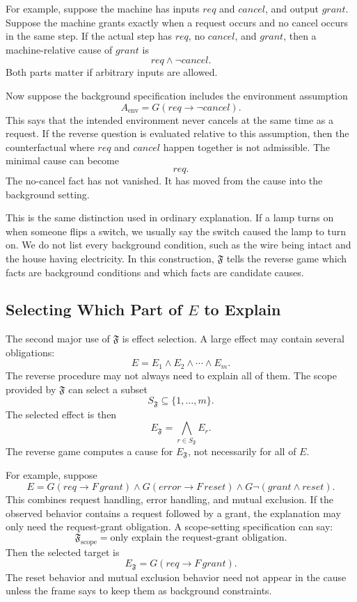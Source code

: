 \documentclass[11pt]{article}
\theoremstyle{remark}
\newcommand{\Frame}{\mathfrak{F}}
\begin{document}
For example, suppose the machine has inputs \(req\) and \(cancel\), and output
\(grant\). Suppose the machine grants exactly when a request occurs and no
cancel occurs in the same step. If the actual step has \(req\), no \(cancel\),
and \(grant\), then a machine-relative cause of \(grant\) is
\[
  req\land \neg cancel.
\]
Both parts matter if arbitrary inputs are allowed.

Now suppose the background specification includes the environment assumption
\[
  A_{\mathrm{env}} = G(req\rightarrow \neg cancel).
\]
This says that the intended environment never cancels at the same time as a
request. If the reverse question is evaluated relative to this assumption, then
the counterfactual where \(req\) and \(cancel\) happen together is not
admissible. The minimal cause can become
\[
  req.
\]
The no-cancel fact has not vanished. It has moved from the cause into the
background setting.

This is the same distinction used in ordinary explanation. If a lamp turns on
when someone flips a switch, we usually say the switch caused the lamp to turn
on. We do not list every background condition, such as the wire being intact and
the house having electricity. In this construction, \(\Frame\) tells the
reverse game which facts are background conditions and which facts are candidate
causes.

\subsection{Selecting Which Part of \texorpdfstring{\(E\)}{E} to Explain}

The second major use of \(\Frame\) is effect selection. A large effect may
contain several obligations:
\[
  E = E_1\land E_2\land \cdots \land E_m.
\]
The reverse procedure may not always need to explain all of them. The scope
provided by \(\Frame\) can select a subset
\[
  S_{\Frame}\subseteq \{1,\ldots,m\}.
\]
The selected effect is then
\[
  E_{\Frame} =
  \bigwedge_{r\in S_{\Frame}} E_r.
\]
The reverse game computes a cause for \(E_{\Frame}\), not necessarily for all of
\(E\).

For example, suppose
\[
  E =
  G(req\rightarrow F\,grant)
  \land
  G(error\rightarrow F\,reset)
  \land
  G\neg(grant\land reset).
\]
This combines request handling, error handling, and mutual exclusion. If the
observed behavior contains a request followed by a grant, the explanation may
only need the request-grant obligation. A scope-setting specification can say:
\[
  \Frame_{\mathrm{scope}}
  =
  \text{only explain the request-grant obligation.}
\]
Then the selected target is
\[
  E_{\Frame} = G(req\rightarrow F\,grant).
\]
The reset behavior and mutual exclusion behavior need not appear in the cause
unless the frame says to keep them as background constraints.
\end{document}
